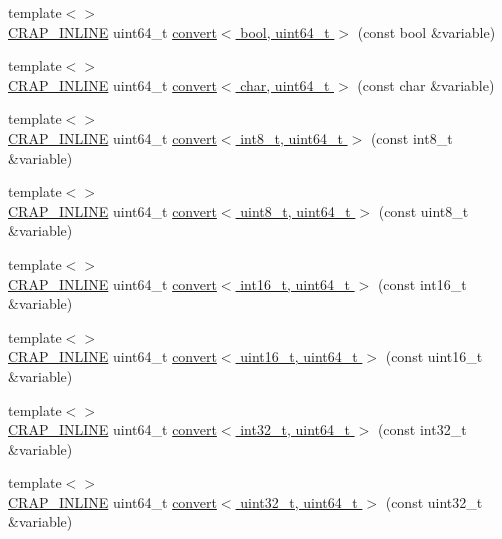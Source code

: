 \begin{DoxyCompactItemize}
\item 
{\footnotesize template$<$$>$ }\\\hyperlink{config__x86_8h_a5a40526b8d842e7ff731509998bb0f1c}{C\+R\+A\+P\+\_\+\+I\+N\+L\+I\+N\+E} uint64\+\_\+t \hyperlink{namespacecrap_ac1984064539fb31244fac30df0bc71b6}{convert$<$ bool, uint64\+\_\+t $>$} (const bool \&variable)
\item 
{\footnotesize template$<$$>$ }\\\hyperlink{config__x86_8h_a5a40526b8d842e7ff731509998bb0f1c}{C\+R\+A\+P\+\_\+\+I\+N\+L\+I\+N\+E} uint64\+\_\+t \hyperlink{namespacecrap_a9a3cbca677db3256e8068fee855d90f6}{convert$<$ char, uint64\+\_\+t $>$} (const char \&variable)
\item 
{\footnotesize template$<$$>$ }\\\hyperlink{config__x86_8h_a5a40526b8d842e7ff731509998bb0f1c}{C\+R\+A\+P\+\_\+\+I\+N\+L\+I\+N\+E} uint64\+\_\+t \hyperlink{namespacecrap_a35c6ad33f99dd81fbf6ef8a7c6632792}{convert$<$ int8\+\_\+t, uint64\+\_\+t $>$} (const int8\+\_\+t \&variable)
\item 
{\footnotesize template$<$$>$ }\\\hyperlink{config__x86_8h_a5a40526b8d842e7ff731509998bb0f1c}{C\+R\+A\+P\+\_\+\+I\+N\+L\+I\+N\+E} uint64\+\_\+t \hyperlink{namespacecrap_aafe112997e6b55d0a78b9ae089161044}{convert$<$ uint8\+\_\+t, uint64\+\_\+t $>$} (const uint8\+\_\+t \&variable)
\item 
{\footnotesize template$<$$>$ }\\\hyperlink{config__x86_8h_a5a40526b8d842e7ff731509998bb0f1c}{C\+R\+A\+P\+\_\+\+I\+N\+L\+I\+N\+E} uint64\+\_\+t \hyperlink{namespacecrap_adafd573c133021e3afea3948484e39f8}{convert$<$ int16\+\_\+t, uint64\+\_\+t $>$} (const int16\+\_\+t \&variable)
\item 
{\footnotesize template$<$$>$ }\\\hyperlink{config__x86_8h_a5a40526b8d842e7ff731509998bb0f1c}{C\+R\+A\+P\+\_\+\+I\+N\+L\+I\+N\+E} uint64\+\_\+t \hyperlink{namespacecrap_ac86b6880286c44599dc238311bba0f27}{convert$<$ uint16\+\_\+t, uint64\+\_\+t $>$} (const uint16\+\_\+t \&variable)
\item 
{\footnotesize template$<$$>$ }\\\hyperlink{config__x86_8h_a5a40526b8d842e7ff731509998bb0f1c}{C\+R\+A\+P\+\_\+\+I\+N\+L\+I\+N\+E} uint64\+\_\+t \hyperlink{namespacecrap_ae5a000fbf6ef354df50291eebcb81fde}{convert$<$ int32\+\_\+t, uint64\+\_\+t $>$} (const int32\+\_\+t \&variable)
\item 
{\footnotesize template$<$$>$ }\\\hyperlink{config__x86_8h_a5a40526b8d842e7ff731509998bb0f1c}{C\+R\+A\+P\+\_\+\+I\+N\+L\+I\+N\+E} uint64\+\_\+t \hyperlink{namespacecrap_a1169116332f7e11d162092a4a2653896}{convert$<$ uint32\+\_\+t, uint64\+\_\+t $>$} (const uint32\+\_\+t \&variable)

\end{DoxyCompactItemize}
